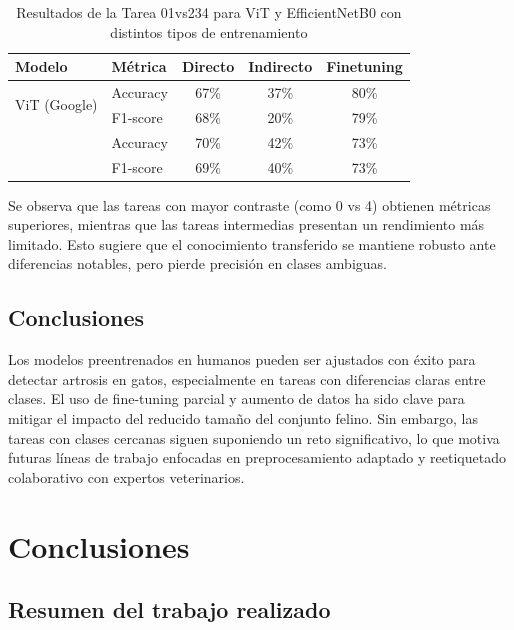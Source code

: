 \documentclass[11pt,spanish,listoffigures,listoftables]{tfgetsinf}
\begin{document}
\begin{table}[h]
    \centering
    \caption{Resultados de la Tarea 01vs234 para ViT y EfficientNetB0 con distintos tipos de entrenamiento}
    \label{tab:model_comparison_results}
    \begin{tabular}{@{} l l c c c @{}} 
        \toprule
        \textbf{Modelo} & \textbf{Métrica} & \textbf{Directo} & \textbf{Indirecto} & \textbf{Finetuning} \\
        \midrule
        \multirow{2}{*}{ViT (Google)} 
            & Accuracy & 67\% & 37\% & 80\% \\
            & F1-score & 68\% & 20\% & 79\% \\
        \addlinespace
        \multirow{2}{*}{EfficientNetB0} 
            & Accuracy & 70\% & 42\% & 73\% \\
            & F1-score & 69\% & 40\% & 73\% \\
        \bottomrule
    \end{tabular}
\end{table}

Se observa que las tareas con mayor contraste (como 0 vs 4) obtienen métricas superiores, mientras que las tareas intermedias presentan un rendimiento más limitado. Esto sugiere que el conocimiento transferido se mantiene robusto ante diferencias notables, pero pierde precisión en clases ambiguas.

\section{Conclusiones}
Los modelos preentrenados en humanos pueden ser ajustados con éxito para detectar artrosis en gatos, especialmente en tareas con diferencias claras entre clases. El uso de fine-tuning parcial y aumento de datos ha sido clave para mitigar el impacto del reducido tamaño del conjunto felino. Sin embargo, las tareas con clases cercanas siguen suponiendo un reto significativo, lo que motiva futuras líneas de trabajo enfocadas en preprocesamiento adaptado y reetiquetado colaborativo con expertos veterinarios.




\chapter{Conclusiones}  %

\section{Resumen del trabajo realizado} %
\end{document}
